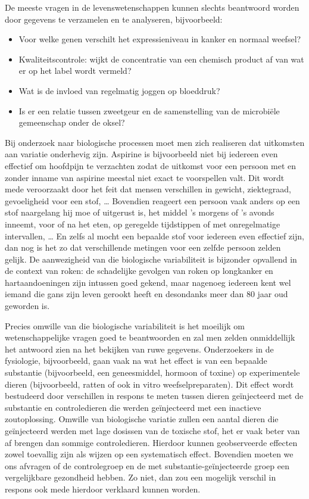 \documentclass[
  12pt,dutch,coursenotes]{book}
\providecommand{\tightlist}{%
  \setlength{\itemsep}{0pt}\setlength{\parskip}{0pt}}
\begin{document}
De meeste vragen in de levenswetenschappen kunnen slechts beantwoord worden door gegevens te verzamelen en te analyseren, bijvoorbeeld:

\begin{itemize}
\tightlist
\item
  Voor welke genen verschilt het expressieniveau in kanker en normaal weefsel?
\item
  Kwaliteitscontrole: wijkt de concentratie van een chemisch product af van wat er op het label wordt vermeld?\\
\item
  Wat is de invloed van regelmatig joggen op bloeddruk?
\item
  Is er een relatie tussen zweetgeur en de samenstelling van de microbiële gemeenschap onder de oksel?
\end{itemize}

Bij onderzoek naar biologische processen moet men zich realiseren dat uitkomsten aan variatie onderhevig zijn. Aspirine is bijvoorbeeld niet bij iedereen even effectief om hoofdpijn te verzachten zodat de uitkomst voor een persoon met en zonder inname van aspirine meestal niet exact te voorspellen valt. Dit wordt mede veroorzaakt door het feit dat mensen verschillen in gewicht, ziektegraad, gevoeligheid voor een stof, \ldots{} Bovendien reageert een persoon vaak anders op een stof naargelang hij moe of uitgerust is, het middel 's morgens of 's avonds inneemt, voor of na het eten, op geregelde tijdstippen of met onregelmatige intervallen, \ldots{} En zelfs al mocht een bepaalde stof voor iedereen even effectief zijn, dan nog is het zo dat verschillende metingen voor een zelfde persoon zelden gelijk.
De aanwezigheid van die biologische variabiliteit is bijzonder opvallend in de context van roken: de schadelijke gevolgen van roken op longkanker en hartaandoeningen zijn intussen goed gekend, maar nagenoeg iedereen kent wel iemand die gans zijn leven gerookt heeft en desondanks meer dan 80 jaar oud geworden is.

Precies omwille van die biologische variabiliteit is het moeilijk om wetenschappelijke vragen goed te beantwoorden en zal men zelden onmiddellijk het antwoord zien na het bekijken van ruwe gegevens. Onderzoekers in de fysiologie, bijvoorbeeld, gaan vaak na wat het effect is van een bepaalde substantie (bijvoorbeeld, een geneesmiddel, hormoon of toxine) op experimentele dieren (bijvoorbeeld, ratten of ook in vitro weefselpreparaten). Dit effect wordt bestudeerd door verschillen in respons te meten tussen dieren geïnjecteerd met de substantie en controledieren die werden geïnjecteerd met een inactieve zoutoplossing. Omwille van biologische variatie zullen een aantal dieren die geïnjecteerd werden met lage dosissen van de toxische stof, het er vaak beter van af brengen dan sommige controledieren. Hierdoor kunnen geobserveerde effecten zowel toevallig zijn als wijzen op een systematisch effect. Bovendien moeten we ons afvragen of de controlegroep en de met substantie-geïnjecteerde groep een vergelijkbare gezondheid hebben. Zo niet, dan zou een mogelijk verschil in respons ook mede hierdoor verklaard kunnen worden.
\end{document}
